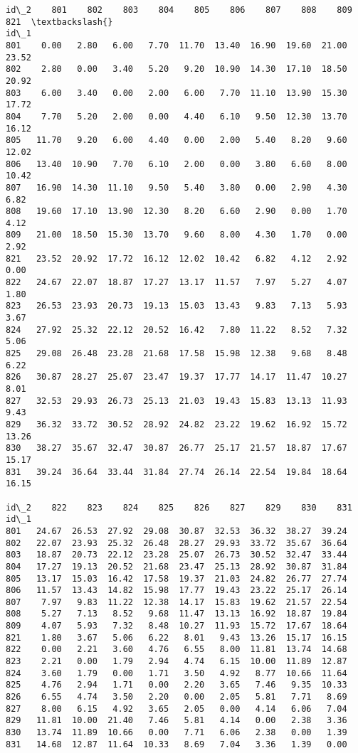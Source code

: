 \documentclass[11pt]{article}
\makeatletter
\newcommand{\boxspacing}{\kern\kvtcb@left@rule\kern\kvtcb@boxsep}
\newcommand{\prompt}[4]{
        {\ttfamily\llap{{\color{#2}[#3]:\hspace{3pt}#4}}\vspace{-\baselineskip}}
    }
\makeatother
\begin{document}
            \begin{tcolorbox}[breakable, size=fbox, boxrule=.5pt, pad at break*=1mm, opacityfill=0]
\prompt{Out}{outcolor}{7}{\boxspacing}
\begin{Verbatim}[commandchars=\\\{\}]
id\_2    801    802    803    804    805    806    807    808    809    821  \textbackslash{}
id\_1
801    0.00   2.80   6.00   7.70  11.70  13.40  16.90  19.60  21.00  23.52
802    2.80   0.00   3.40   5.20   9.20  10.90  14.30  17.10  18.50  20.92
803    6.00   3.40   0.00   2.00   6.00   7.70  11.10  13.90  15.30  17.72
804    7.70   5.20   2.00   0.00   4.40   6.10   9.50  12.30  13.70  16.12
805   11.70   9.20   6.00   4.40   0.00   2.00   5.40   8.20   9.60  12.02
806   13.40  10.90   7.70   6.10   2.00   0.00   3.80   6.60   8.00  10.42
807   16.90  14.30  11.10   9.50   5.40   3.80   0.00   2.90   4.30   6.82
808   19.60  17.10  13.90  12.30   8.20   6.60   2.90   0.00   1.70   4.12
809   21.00  18.50  15.30  13.70   9.60   8.00   4.30   1.70   0.00   2.92
821   23.52  20.92  17.72  16.12  12.02  10.42   6.82   4.12   2.92   0.00
822   24.67  22.07  18.87  17.27  13.17  11.57   7.97   5.27   4.07   1.80
823   26.53  23.93  20.73  19.13  15.03  13.43   9.83   7.13   5.93   3.67
824   27.92  25.32  22.12  20.52  16.42   7.80  11.22   8.52   7.32   5.06
825   29.08  26.48  23.28  21.68  17.58  15.98  12.38   9.68   8.48   6.22
826   30.87  28.27  25.07  23.47  19.37  17.77  14.17  11.47  10.27   8.01
827   32.53  29.93  26.73  25.13  21.03  19.43  15.83  13.13  11.93   9.43
829   36.32  33.72  30.52  28.92  24.82  23.22  19.62  16.92  15.72  13.26
830   38.27  35.67  32.47  30.87  26.77  25.17  21.57  18.87  17.67  15.17
831   39.24  36.64  33.44  31.84  27.74  26.14  22.54  19.84  18.64  16.15

id\_2    822    823    824    825    826    827    829    830    831
id\_1
801   24.67  26.53  27.92  29.08  30.87  32.53  36.32  38.27  39.24
802   22.07  23.93  25.32  26.48  28.27  29.93  33.72  35.67  36.64
803   18.87  20.73  22.12  23.28  25.07  26.73  30.52  32.47  33.44
804   17.27  19.13  20.52  21.68  23.47  25.13  28.92  30.87  31.84
805   13.17  15.03  16.42  17.58  19.37  21.03  24.82  26.77  27.74
806   11.57  13.43  14.82  15.98  17.77  19.43  23.22  25.17  26.14
807    7.97   9.83  11.22  12.38  14.17  15.83  19.62  21.57  22.54
808    5.27   7.13   8.52   9.68  11.47  13.13  16.92  18.87  19.84
809    4.07   5.93   7.32   8.48  10.27  11.93  15.72  17.67  18.64
821    1.80   3.67   5.06   6.22   8.01   9.43  13.26  15.17  16.15
822    0.00   2.21   3.60   4.76   6.55   8.00  11.81  13.74  14.68
823    2.21   0.00   1.79   2.94   4.74   6.15  10.00  11.89  12.87
824    3.60   1.79   0.00   1.71   3.50   4.92   8.77  10.66  11.64
825    4.76   2.94   1.71   0.00   2.20   3.65   7.46   9.35  10.33
826    6.55   4.74   3.50   2.20   0.00   2.05   5.81   7.71   8.69
827    8.00   6.15   4.92   3.65   2.05   0.00   4.14   6.06   7.04
829   11.81  10.00  21.40   7.46   5.81   4.14   0.00   2.38   3.36
830   13.74  11.89  10.66   0.00   7.71   6.06   2.38   0.00   1.39
831   14.68  12.87  11.64  10.33   8.69   7.04   3.36   1.39   0.00
\end{Verbatim}
\end{tcolorbox}
        
\end{document}
